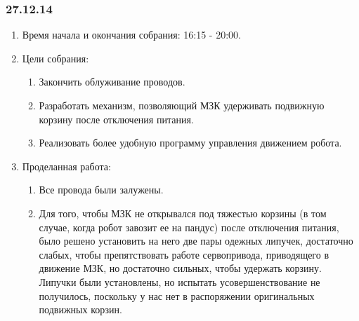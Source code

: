 \subsubsection{27.12.14}
\begin{enumerate}
	
	\item Время начала и окончания собрания: 16:15 - 20:00.
	
	\item Цели собрания: 
	\begin{enumerate}
		
		\item Закончить облуживание проводов.
		
		\item Разработать механизм, позволяющий МЗК удерживать подвижную корзину после отключения питания.
		
        \item Реализовать более удобную программу управления движением робота.
		
	\end{enumerate}

	\item Проделанная работа:
	\begin{enumerate}
		
		\item Все провода были залужены.
		
		\item Для того, чтобы МЗК не открывался под тяжестью корзины (в том случае, когда робот завозит ее на пандус) после отключения питания, было решено установить на него две пары одежных липучек, достаточно слабых, чтобы препятствовать работе сервопривода, приводящего в движение МЗК, но достаточно сильных, чтобы удержать корзину. Липучки были установлены, но испытать усовершенствование не получилось, поскольку у нас нет в распоряжении оригинальных подвижных корзин.
		

\end{enumerate}
\end{enumerate}
